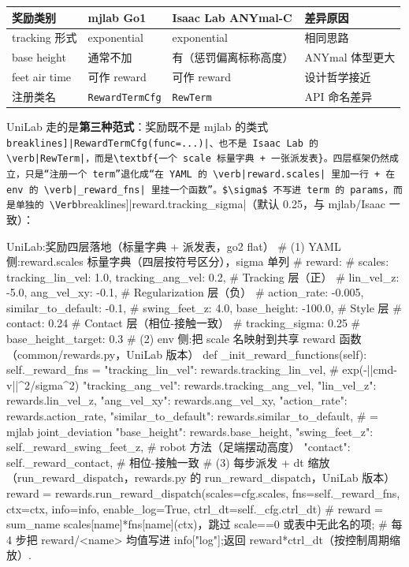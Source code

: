 \begin{center}
\small
\begin{tabular}{@{}llll@{}}
\toprule
奖励类别 & mjlab Go1 & Isaac Lab ANYmal-C & 差异原因 \\
\midrule
tracking 形式 & exponential & exponential & 相同思路 \\
base height & 通常不加 & 有（惩罚偏离标称高度） & ANYmal 体型更大 \\
feet air time & 可作 reward & 可作 reward & 设计哲学接近 \\
注册类名 & \verb|RewardTermCfg| & \verb|RewTerm| & API 命名差异 \\
\bottomrule
\end{tabular}
\end{center}

UniLab 走的是\textbf{第三种范式}：奖励既不是 mjlab 的类式 \Verb[breaklines]|RewardTermCfg(func=...)|、也不是 Isaac Lab 的 \verb|RewTerm|，而是\textbf{一个 scale 标量字典 + 一张派发表}。四层框架仍然成立，只是“注册一个 term”退化成“在 YAML 的 \verb|reward.scales| 里加一行 + 在 env 的 \verb|_reward_fns| 里挂一个函数”。$\sigma$ 不写进 term 的 params，而是单独的 \Verb[breaklines]|reward.tracking_sigma|（默认 0.25，与 mjlab/Isaac 一致）：

\begin{codebox}[Python]{UniLab:奖励四层落地（标量字典 + 派发表，go2 flat）}
# (1) YAML 侧:reward.scales 标量字典（四层按符号区分），sigma 单列
# reward:
#   scales: {tracking_lin_vel: 1.0, tracking_ang_vel: 0.2,   # Tracking 层（正）
#            lin_vel_z: -5.0, ang_vel_xy: -0.1,              # Regularization 层（负）
#            action_rate: -0.005, similar_to_default: -0.1,
#            swing_feet_z: 4.0, base_height: -100.0,         # Style 层
#            contact: 0.24}                                  # Contact 层（相位-接触一致）
#   tracking_sigma: 0.25
#   base_height_target: 0.3
# (2) env 侧:把 scale 名映射到共享 reward 函数（common/rewards.py，UniLab 版本）
def _init_reward_functions(self):
    self._reward_fns = {
        "tracking_lin_vel":    rewards.tracking_lin_vel,      # exp(-||cmd-v||^2/sigma^2)
        "tracking_ang_vel":    rewards.tracking_ang_vel,
        "lin_vel_z":           rewards.lin_vel_z,
        "ang_vel_xy":          rewards.ang_vel_xy,
        "action_rate":         rewards.action_rate,
        "similar_to_default":  rewards.similar_to_default,    # = mjlab joint_deviation
        "base_height":         rewards.base_height,
        "swing_feet_z":        self._reward_swing_feet_z,      # robot 方法（足端摆动高度）
        "contact":             self._reward_contact,          # 相位-接触一致
    }
# (3) 每步派发 + dt 缩放（run_reward_dispatch，rewards.py 的 run_reward_dispatch，UniLab 版本）
reward = rewards.run_reward_dispatch(scales=cfg.scales, fns=self._reward_fns,
                                     ctx=ctx, info=info, enable_log=True,
                                     ctrl_dt=self._cfg.ctrl_dt)
#   reward = sum_name scales[name]*fns[name](ctx)，跳过 scale==0 或表中无此名的项;
#   每 4 步把 reward/<name> 均值写进 info["log"];返回 reward*ctrl_dt（按控制周期缩放）.
\end{codebox}


